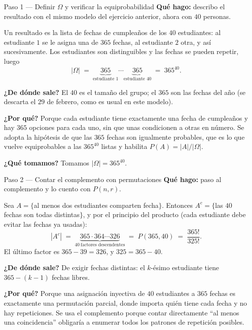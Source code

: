 \documentclass[11pt]{article}
\begin{document}
\begin{sol}

\begin{paso}{Paso 1 --- Definir $\Omega$ y verificar la equiprobabilidad}
\textbf{Qu\'e hago:} describo el resultado con el mismo modelo del ejercicio anterior, ahora con $40$ personas.

Un resultado es la lista de fechas de cumplea\~nos de los $40$ estudiantes: al estudiante $1$ se le asigna una de $365$ fechas, al estudiante $2$ otra, y as\'i sucesivamente. Los estudiantes son distinguibles y las fechas se pueden repetir, luego
\[
|\Omega| \;=\; \underbrace{365}_{\text{estudiante 1}}\cdots\underbrace{365}_{\text{estudiante 40}} \;=\; 365^{40}.
\]

\textbf{¿De d\'onde sale?} El $40$ es el tama\~no del grupo; el $365$ son las fechas del a\~no (se descarta el $29$ de febrero, como es usual en este modelo).

\textbf{¿Por qu\'e?} Porque cada estudiante tiene exactamente una fecha de cumplea\~nos y hay $365$ opciones para cada uno, sin que unas condicionen a otras en n\'umero. Se adopta la hip\'otesis de que las $365$ fechas son igualmente probables, que es lo que vuelve equiprobables a las $365^{40}$ listas y habilita $P(A)=|A|/|\Omega|$.

\textbf{¿Qu\'e tomamos?} Tomamos $|\Omega|=365^{40}$.
\end{paso}

\begin{paso}{Paso 2 --- Contar el complemento con permutaciones}
\textbf{Qu\'e hago:} paso al complemento y lo cuento con $P(n,r)$.

Sea $A=\{$al menos dos estudiantes comparten fecha$\}$. Entonces $A^{c}=\{$las $40$ fechas son todas distintas$\}$, y por el principio del producto (cada estudiante debe evitar las fechas ya usadas):
\[
|A^{c}| \;=\; \underbrace{365\cdot 364\cdots 326}_{40\ \text{factores descendentes}} \;=\; P(365,40)\;=\;\frac{365!}{325!} .
\]
El \'ultimo factor es $365-39=326$, y $325=365-40$.

\textbf{¿De d\'onde sale?} De exigir fechas distintas: el $k$-\'esimo estudiante tiene $365-(k-1)$ fechas libres.

\textbf{¿Por qu\'e?} Porque una asignaci\'on inyectiva de $40$ estudiantes a $365$ fechas es exactamente una permutaci\'on parcial, donde importa qui\'en tiene cada fecha y no hay repeticiones. Se usa el complemento porque contar directamente ``al menos una coincidencia'' obligar\'ia a enumerar todos los patrones de repetici\'on posibles.


\end{paso}
\end{sol}
\end{document}
